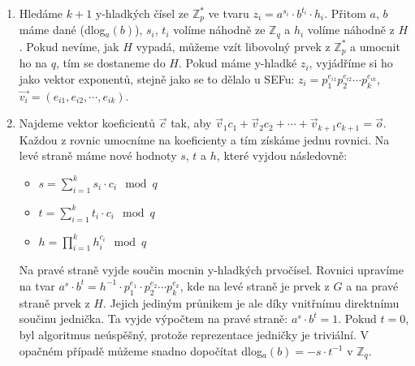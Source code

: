 \documentclass[10pt,a4paper]{article}
\begin{document}
\begin{enumerate}
\item Hledáme $k+1$ y-hladkých čísel ze $\mathbb{Z}_p^*$ ve tvaru $z_i =
a^{s_i}\cdot b^{t_i}\cdot h_i$. Přitom $a$, $b$ máme dané (dlog$_a(b)$), $s_i$,
$t_i$ volíme náhodně ze  $\mathbb{Z}_q$ a $h_i$ volíme náhodně z $H$. Pokud
nevíme, jak $H$ vypadá, můžeme vzít libovolný prvek z  $\mathbb{Z}_p^*$ a
umocnit ho na $q$, tím se dostaneme do $H$. Pokud máme y-hladké $z_i$, vyjádříme
si ho jako vektor exponentů, stejně jako se to dělalo u SEFu: $z_i =
p_1^{e_{i1}}p_2^{e_{i2}}\cdots p_k^{e_{ik}}$, $\vec{v_i} = (e_{i1}, e_{i2},
\cdots, e_{ik})$.
\item Najdeme vektor koeficientů $\vec{c}$ tak, aby $\vec{v}_1c_1 + \vec{v}_2c_2
+ \cdots + \vec{v}_{k+1}c_{k+1} = \vec{o}$. Každou z rovnic umocníme na
koeficienty a tím získáme jednu rovnici. Na levé straně máme nové hodnoty $s$,
$t$ a $h$, které vyjdou následovně:
\begin{itemize}
\item $s = \sum_{i=1}^k s_i \cdot c_i \mod q$
\item $t = \sum_{i=1}^k t_i \cdot c_i \mod q$
\item $h = \prod_{i=1}^k h_i^{c_i} \mod q$
\end{itemize}
Na pravé straně vyjde součin mocnin y-hladkých prvočísel. Rovnici upravíme na
tvar $a^s\cdot b^t = h^{-1}\cdot p_1^{e_1}\cdot p_2^{e_2}\cdots p_k^{e_k}$, kde
na levé straně je prvek z $G$ a na pravé straně prvek z $H$. Jejich jediným
průnikem je ale díky vnitřnímu direktnímu součinu jednička. Ta vyjde výpočtem na
pravé straně: $a^s\cdot b^t = 1$. Pokud $t=0$, byl algoritmus neúspěšný, protože
reprezentace jedničky je triviální. V opačném případě můžeme snadno dopočítat
dlog$_a(b) = -s \cdot t^{-1}$ v $\mathbb{Z}_q$.
\end{enumerate}
\end{document}
